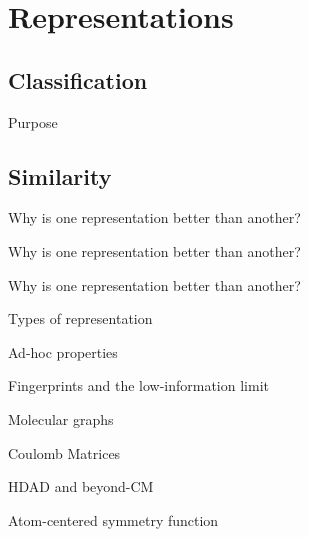 
\section{Representations}
\subsection{Classification}
\begin{frame}[t]{Purpose}

\end{frame}
%
\subsection{Similarity}
\begin{frame}[t]{Why is one representation better than another?}

\end{frame}
\begin{frame}[t]{Why is one representation better than another?}

\end{frame}
\begin{frame}[t]{Why is one representation better than another?}

\end{frame}
\begin{frame}[t]{Types of representation}

\end{frame}
\begin{frame}[t]{Ad-hoc properties}

\end{frame}
\begin{frame}[t]{Fingerprints and the low-information limit}

\end{frame}
\begin{frame}[t]{Molecular graphs}

\end{frame}
\begin{frame}[t]{Coulomb Matrices}
%
\end{frame}
\begin{frame}[t]{HDAD and beyond-CM}
%
\end{frame}
\begin{frame}{Atom-centered symmetry function}
%
\end{frame}
%
%
%

